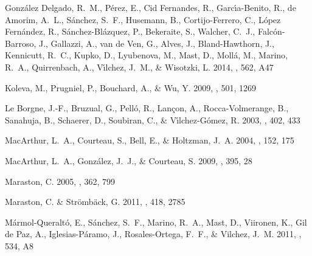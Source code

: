 \begin{thebibliography}
{Gonz{\'a}lez Delgado}, R.~M., {P{\'e}rez}, E., {Cid Fernandes}, R.,
  {Garc{\'{\i}}a-Benito}, R., {de Amorim}, A.~L., {S{\'a}nchez}, S.~F.,
  {Husemann}, B., {Cortijo-Ferrero}, C., {L{\'o}pez Fern{\'a}ndez}, R.,
  {S{\'a}nchez-Bl{\'a}zquez}, P., {Bekeraite}, S., {Walcher}, C.~J.,
  {Falc{\'o}n-Barroso}, J., {Gallazzi}, A., {van de Ven}, G., {Alves}, J.,
  {Bland-Hawthorn}, J., {Kennicutt}, R.~C., {Kupko}, D., {Lyubenova}, M.,
  {Mast}, D., {Moll{\'a}}, M., {Marino}, R.~A., {Quirrenbach}, A.,
  {V{\'{\i}}lchez}, J.~M., \& {Wisotzki}, L. 2014, \aap, 562, A47


{Koleva}, M., {Prugniel}, P., {Bouchard}, A., \& {Wu}, Y. 2009, \aap, 501, 1269


{Le Borgne}, J.-F., {Bruzual}, G., {Pell{\'o}}, R., {Lan{\c c}on}, A.,
  {Rocca-Volmerange}, B., {Sanahuja}, B., {Schaerer}, D., {Soubiran}, C., \&
  {V{\'{\i}}lchez-G{\'o}mez}, R. 2003, \aap, 402, 433


{MacArthur}, L.~A., {Courteau}, S., {Bell}, E., \& {Holtzman}, J.~A. 2004,
  \apjs, 152, 175


{MacArthur}, L.~A., {Gonz{\'a}lez}, J.~J., \& {Courteau}, S. 2009, \mnras, 395,
  28


{Maraston}, C. 2005, \mnras, 362, 799


{Maraston}, C. \& {Str{\"o}mb{\"a}ck}, G. 2011, \mnras, 418, 2785


{M{\'a}rmol-Queralt{\'o}}, E., {S{\'a}nchez}, S.~F., {Marino}, R.~A., {Mast},
  D., {Viironen}, K., {Gil de Paz}, A., {Iglesias-P{\'a}ramo}, J.,
  {Rosales-Ortega}, F.~F., \& {Vilchez}, J.~M. 2011, \aap, 534, A8



\end{thebibliography}
